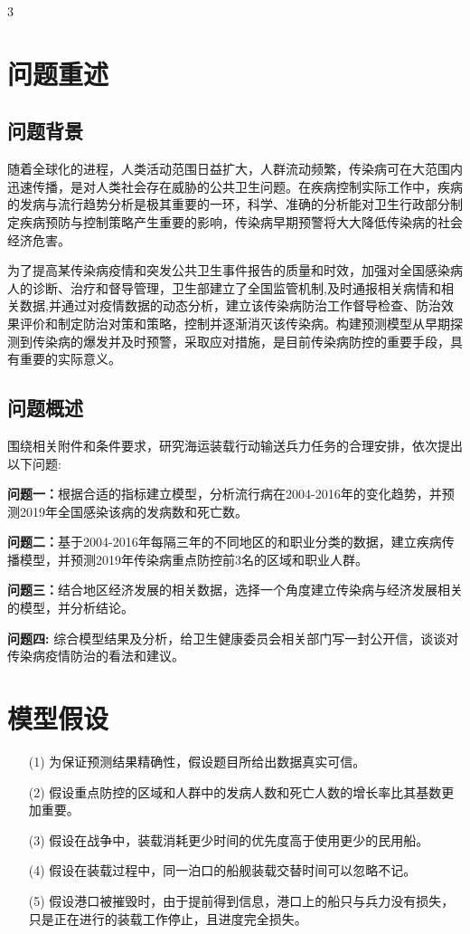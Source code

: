 \documentclass{whutmod}
\begin{document}
3	\tableofcontents
	\newpage	%
	
	\section{问题重述}	
	\subsection{问题背景}
    随着全球化的进程，人类活动范围日益扩大，人群流动频繁，传染病可在大范围内迅速传播，是对人类社会存在威胁的公共卫生问题。在疾病控制实际工作中，疾病的发病与流行趋势分析是极其重要的一环，科学、准确的分析能对卫生行政部分制定疾病预防与控制策略产生重要的影响，传染病早期预警将大大降低传染病的社会经济危害。
    
    为了提高某传染病疫情和突发公共卫生事件报告的质量和时效，加强对全国感染病人的诊断、治疗和督导管理，卫生部建立了全国监管机制,及时通报相关病情和相关数据,并通过对疫情数据的动态分析，建立该传染病防治工作督导检查、防治效果评价和制定防治对策和策略，控制并逐渐消灭该传染病。构建预测模型从早期探测到传染病的爆发并及时预警，采取应对措施，是目前传染病防控的重要手段，具有重要的实际意义。
    
    

	\subsection{问题概述}
    围绕相关附件和条件要求，研究海运装载行动输送兵力任务的合理安排，依次提出以下问题:
		 
	
	\textbf{问题一：}根据合适的指标建立模型，分析流行病在2004-2016年的变化趋势，并预测2019年全国感染该病的发病数和死亡数。
	
	\textbf{问题二：}基于2004-2016年每隔三年的不同地区的和职业分类的数据，建立疾病传播模型，并预测2019年传染病重点防控前3名的区域和职业人群。
		
	\textbf{问题三：}结合地区经济发展的相关数据，选择一个角度建立传染病与经济发展相关的模型，并分析结论。
	
	\textbf{问题四: }综合模型结果及分析，给卫生健康委员会相关部门写一封公开信，谈谈对传染病疫情防治的看法和建议。
	
	
	\section{模型假设}
	\begin{itemize}                                             
		\item [(1)] 为保证预测结果精确性，假设题目所给出数据真实可信。
		\item [(2)] 假设重点防控的区域和人群中的发病人数和死亡人数的增长率比其基数更加重要。
		\item [(3)] 假设在战争中，装载消耗更少时间的优先度高于使用更少的民用船。
		\item [(4)] 假设在装载过程中，同一泊口的船舰装载交替时间可以忽略不记。
		\item [(5)] 假设港口被摧毁时，由于提前得到信息，港口上的船只与兵力没有损失，只是正在进行的装载工作停止，且进度完全损失。
	\end{itemize}
	
\end{document}
